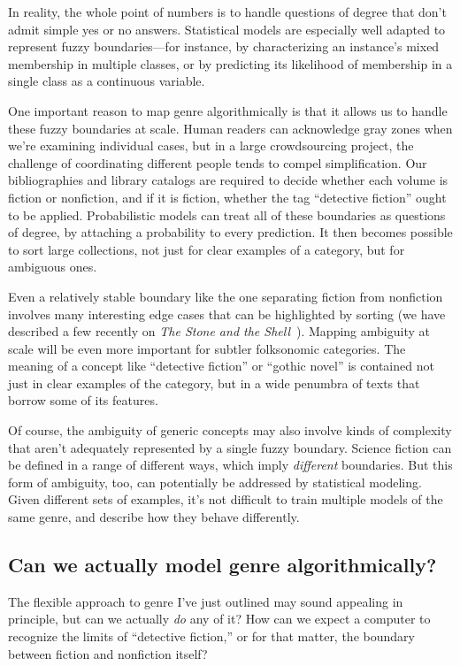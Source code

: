 \documentclass[paper=a4, fontsize=12pt]{scrartcl}
\numberwithin{equation}{section}		%
\numberwithin{figure}{section}			%
\numberwithin{table}{section}				%
\begin{document}
In reality, the whole point of numbers is to handle questions of degree that don't admit simple yes or no answers. Statistical models are especially well adapted to represent fuzzy boundaries---for instance, by characterizing an instance's mixed membership in multiple classes, or by predicting its likelihood of membership in a single class as a continuous variable.

One important reason to map genre algorithmically is that it allows us to handle these fuzzy boundaries at scale. Human readers can acknowledge gray zones when we're examining individual cases, but in a large crowdsourcing project, the challenge of coordinating different people tends to compel simplification. Our bibliographies and library catalogs are required to decide whether each volume is fiction or nonfiction, and if it is fiction, whether the tag ``detective fiction'' ought to be applied. Probabilistic models can treat all of these boundaries as questions of degree, by attaching a probability to every prediction. It then becomes possible to sort large collections, not just for clear examples of a category, but for ambiguous ones. 

Even a relatively stable boundary like the one separating fiction from nonfiction involves many interesting edge cases that can be highlighted by sorting (we have described a few recently on \textit{The Stone and the Shell}~\cite{underwood:blurry}). Mapping ambiguity at scale will be even more important for subtler folksonomic categories. The meaning of a concept like ``detective fiction'' or ``gothic novel'' is contained not just in clear examples of the category, but in a wide penumbra of texts that borrow some of its features. 

Of course, the ambiguity of generic concepts may also involve kinds of complexity that aren't adequately represented by a single fuzzy boundary. Science fiction can be defined in a range of different ways, which imply \textit{different} boundaries. But this form of ambiguity, too, can potentially be addressed by statistical modeling. Given different sets of examples, it's not difficult to train multiple models of the same genre, and describe how they behave differently.

\subsection{Can we actually model genre algorithmically?}

The flexible approach to genre I've just outlined may sound appealing in principle, but can we actually \textit{do} any of it? How can we expect a computer to recognize the limits of ``detective fiction,'' or for that matter, the boundary between fiction and nonfiction itself?
\end{document}
